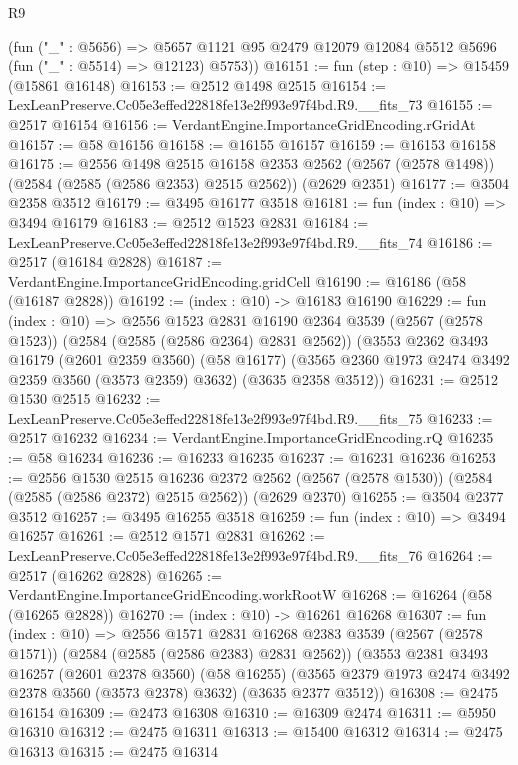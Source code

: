 \begin{lexlean}{R9}
\begin{coremodule}
      (fun ("_" : @5656) =>
      @5657 @1121 @95 @2479 @12079 @12084 @5512 @5696 (fun ("_" : @5514) => @12123) @5753))
@16151 := fun (step : @10) => @15459 (@15861 @16148)
@16153 := @2512 @1498 @2515
@16154 := LexLeanPreserve.Cc05e3effed22818fe13e2f993e97f4bd.R9.__fits_73
@16155 := @2517 @16154
@16156 := VerdantEngine.ImportanceGridEncoding.rGridAt
@16157 := @58 @16156
@16158 := @16155 @16157
@16159 := @16153 @16158
@16175 := @2556
    @1498
    @2515
    @16158
    @2353
    @2562
    (@2567 (@2578 @1498))
    (@2584 (@2585 (@2586 @2353) @2515 @2562))
    (@2629 @2351)
@16177 := @3504 @2358 @3512
@16179 := @3495 @16177 @3518
@16181 := fun (index : @10) => @3494 @16179
@16183 := @2512 @1523 @2831
@16184 := LexLeanPreserve.Cc05e3effed22818fe13e2f993e97f4bd.R9.__fits_74
@16186 := @2517 (@16184 @2828)
@16187 := VerdantEngine.ImportanceGridEncoding.gridCell
@16190 := @16186 (@58 (@16187 @2828))
@16192 := (index : @10) -> @16183 @16190
@16229 := fun (index : @10) =>
  @2556
    @1523
    @2831
    @16190
    @2364
    @3539
    (@2567 (@2578 @1523))
    (@2584 (@2585 (@2586 @2364) @2831 @2562))
    (@3553
      @2362
      @3493
      @16179
      (@2601 @2359 @3560)
      (@58 @16177)
      (@3565 @2360 @1973 @2474 @3492 @2359 @3560 (@3573 @2359) @3632)
      (@3635 @2358 @3512))
@16231 := @2512 @1530 @2515
@16232 := LexLeanPreserve.Cc05e3effed22818fe13e2f993e97f4bd.R9.__fits_75
@16233 := @2517 @16232
@16234 := VerdantEngine.ImportanceGridEncoding.rQ
@16235 := @58 @16234
@16236 := @16233 @16235
@16237 := @16231 @16236
@16253 := @2556
    @1530
    @2515
    @16236
    @2372
    @2562
    (@2567 (@2578 @1530))
    (@2584 (@2585 (@2586 @2372) @2515 @2562))
    (@2629 @2370)
@16255 := @3504 @2377 @3512
@16257 := @3495 @16255 @3518
@16259 := fun (index : @10) => @3494 @16257
@16261 := @2512 @1571 @2831
@16262 := LexLeanPreserve.Cc05e3effed22818fe13e2f993e97f4bd.R9.__fits_76
@16264 := @2517 (@16262 @2828)
@16265 := VerdantEngine.ImportanceGridEncoding.workRootW
@16268 := @16264 (@58 (@16265 @2828))
@16270 := (index : @10) -> @16261 @16268
@16307 := fun (index : @10) =>
  @2556
    @1571
    @2831
    @16268
    @2383
    @3539
    (@2567 (@2578 @1571))
    (@2584 (@2585 (@2586 @2383) @2831 @2562))
    (@3553
      @2381
      @3493
      @16257
      (@2601 @2378 @3560)
      (@58 @16255)
      (@3565 @2379 @1973 @2474 @3492 @2378 @3560 (@3573 @2378) @3632)
      (@3635 @2377 @3512))
@16308 := @2475 @16154
@16309 := @2473 @16308
@16310 := @16309 @2474
@16311 := @5950 @16310
@16312 := @2475 @16311
@16313 := @15400 @16312
@16314 := @2475 @16313
@16315 := @2475 @16314

\end{coremodule}
\end{lexlean}
